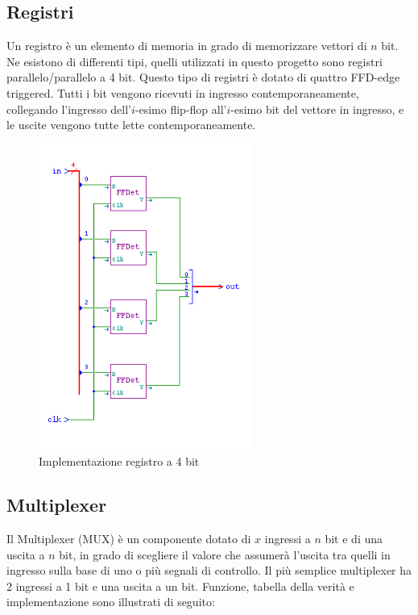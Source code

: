 \documentclass[10pt]{article}
\begin{document}
\begin{itemize}
\subsection{Registri}
Un registro è un elemento di memoria in grado di memorizzare vettori di $n$ bit. Ne esistono di differenti tipi, quelli utilizzati in questo progetto sono registri parallelo/parallelo a 4 bit.
Questo tipo di registri è dotato di quattro FFD-edge triggered. Tutti i bit vengono ricevuti in ingresso contemporaneamente, collegando l'ingresso dell'$i$-esimo flip-flop all'$i$-esimo bit del 
vettore in ingresso, e le uscite vengono tutte lette contemporaneamente. 

\begin{figure}[H]
    \begin{minipage}[b]{\textwidth}
    \centering
    \includegraphics[width=70mm]{reg4}
    \caption{Implementazione registro a 4 bit}
    \label{ }
    \end{minipage}
    \end{figure}

\subsection{Multiplexer}
Il Multiplexer (MUX) è un componente dotato di $x$ ingressi a $n$ bit e di una uscita a $n$ bit, in grado di scegliere il valore che assumerà l'uscita tra quelli in ingresso sulla base di uno o più segnali
di controllo. Il più semplice multiplexer ha 2 ingressi a 1 bit e una uscita a un bit. Funzione, tabella della verità e implementazione sono illustrati di seguito:


\end{itemize}
\end{document}
